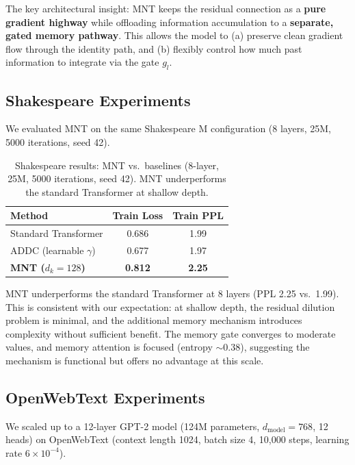\documentclass[10pt]{article}
\begin{document}
The key architectural insight: MNT keeps the residual connection as a \textbf{pure gradient highway} while offloading information accumulation to a \textbf{separate, gated memory pathway}. This allows the model to (a) preserve clean gradient flow through the identity path, and (b) flexibly control how much past information to integrate via the gate $g_l$.

\subsection{Shakespeare Experiments}

We evaluated MNT on the same Shakespeare M configuration (8 layers, 25M, 5000 iterations, seed 42).

\begin{table}[H]
    \centering
    \caption{Shakespeare results: MNT vs.\ baselines (8-layer, 25M, 5000 iterations, seed 42). MNT underperforms the standard Transformer at shallow depth.}
    \label{tab:mnt_shakespeare}
    \begin{tabular}{lcc}
        \toprule
        \textbf{Method} & \textbf{Train Loss} & \textbf{Train PPL} \\
        \midrule
        Standard Transformer & 0.686 & 1.99 \\
        ADDC (learnable $\gamma$) & 0.677 & 1.97 \\
        \textbf{MNT ($d_k=128$)} & \textbf{0.812} & \textbf{2.25} \\
        \bottomrule
    \end{tabular}
\end{table}

MNT underperforms the standard Transformer at 8 layers (PPL 2.25 vs.\ 1.99). This is consistent with our expectation: at shallow depth, the residual dilution problem is minimal, and the additional memory mechanism introduces complexity without sufficient benefit. The memory gate converges to moderate values, and memory attention is focused (entropy ${\sim}0.38$), suggesting the mechanism is functional but offers no advantage at this scale.

\subsection{OpenWebText Experiments}

We scaled up to a 12-layer GPT-2 model (124M parameters, $d_{\text{model}}=768$, 12 heads) on OpenWebText (context length 1024, batch size 4, 10,000 steps, learning rate $6\times10^{-4}$).
\end{document}
